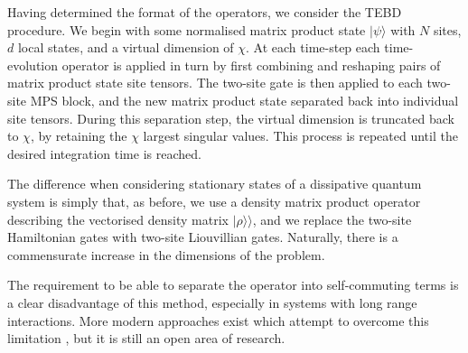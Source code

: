 Having determined the format of the operators, we consider the TEBD procedure. We begin with some normalised matrix product state \(|\psi\rangle\) with \(N\) sites, \(d\) local states, and a virtual dimension of \(\chi\). At each time-step each time-evolution operator is applied in turn by first combining and reshaping pairs of matrix product state site tensors. The two-site gate is then applied to each two-site MPS block, and the new matrix product state separated back into individual site tensors. During this separation step, the virtual dimension is truncated back to \(\chi\), by retaining the \(\chi\) largest singular values. This process is repeated until the desired integration time is reached.

The difference when considering stationary states of a dissipative quantum system is simply that, as before, we use a density matrix product operator describing the vectorised density matrix \(| \rho \rangle\rangle\), and we replace the two-site Hamiltonian gates with two-site Liouvillian gates. Naturally, there is a commensurate increase in the dimensions of the problem.

The requirement to be able to separate the operator into self-commuting terms is a clear disadvantage of this method, especially in systems with long range interactions. More modern approaches exist which attempt to overcome this limitation \cite{Zaletel2015,Haegeman2016}, but it is still an open area of research.
